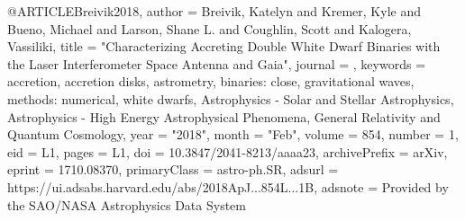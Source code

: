\documentclass[twocolumn,tighten]{aastex63}
\begin{document}
@ARTICLE{Breivik2018,
       author = {{Breivik}, Katelyn and {Kremer}, Kyle and {Bueno}, Michael and
         {Larson}, Shane L. and {Coughlin}, Scott and {Kalogera}, Vassiliki},
        title = "{Characterizing Accreting Double White Dwarf Binaries with the Laser Interferometer Space Antenna and Gaia}",
      journal = {\apjl},
     keywords = {accretion, accretion disks, astrometry, binaries: close, gravitational waves, methods: numerical, white dwarfs, Astrophysics - Solar and Stellar Astrophysics, Astrophysics - High Energy Astrophysical Phenomena, General Relativity and Quantum Cosmology},
         year = "2018",
        month = "Feb",
       volume = {854},
       number = {1},
          eid = {L1},
        pages = {L1},
          doi = {10.3847/2041-8213/aaaa23},
archivePrefix = {arXiv},
       eprint = {1710.08370},
 primaryClass = {astro-ph.SR},
       adsurl = {https://ui.adsabs.harvard.edu/abs/2018ApJ...854L...1B},
      adsnote = {Provided by the SAO/NASA Astrophysics Data System}
}
\end{document}
